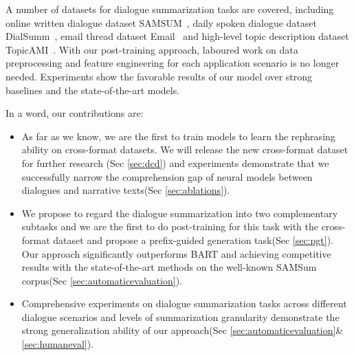 A number of datasets for dialogue summarization tasks %
are covered, including online written dialogue dataset SAMSUM~\cite{gliwa2019samsum}, daily spoken dialogue dataset DialSumm~\cite{chen2021dialsumm}, email thread dataset Email~\cite{fabbri2021convosumm} and high-level topic description dataset TopicAMI~\cite{goo2018abstractive}. 
With our post-training approach, laboured work on data preprocessing and feature engineering for each application scenario is no longer needed. 
Experiments show the favorable results of our model over strong baselines and the state-of-the-art models.


In a word, our contributions are:
\begin{itemize}
\item As far as we know, we are the first to train models to learn the rephrasing ability on cross-format datasets. We will release the new cross-format dataset for further research (Sec \ref{sec:dcd}) and experiments demonstrate that we successfully narrow the comprehension gap of neural models between dialogues and narrative texts(Sec \ref{sec:ablations}).
 
\item We propose to regard the dialogue summarization into two complementary subtasks and we are the first to do post-training for this task with the cross-format dataset and propose a prefix-guided generation task(Sec \ref{sec:pgt}). %
Our approach significantly outperforms BART and achieving competitive results with the state-of-the-art methods on the well-known SAMSum corpus(Sec \ref{sec:automaticevaluation}).

\item Comprehensive experiments on dialogue summarization tasks across different dialogue scenarios and levels of summarization granularity demonstrate the strong generalization ability of our approach(Sec \ref{sec:automaticevaluation}\&\ref{sec:humaneval}).
\end{itemize}





